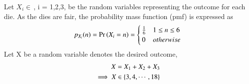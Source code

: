 

Let
$X_i\in\,$, i = 1,2,3, be the random variables representing the outcome for each die. As the dies are fair, the probability mass function (pmf) is expressed as
\begin{align}
    p_{X_i}(n) = \pr{X_i = n} = 
\begin{cases}
\frac{1}{6} & 1 \le n \le 6
\\
0 & otherwise
\end{cases}\label{1}
\end{align}
Let X be a random variable denotes the desired outcome,
\begin{align}
    X=X_1+X_2+X_3\label{2}\\
    \implies X\in\cbrak{3,4,\cdots,18}
\end{align}

